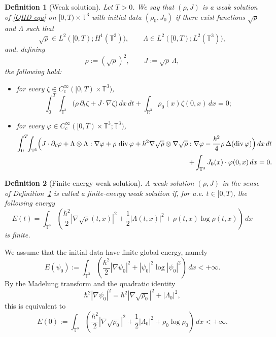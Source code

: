 \documentclass[11pt]{article}
\newtheorem{definition}{Definition}
\begin{document}
\begin{definition}[Weak solution]
\label{def:intro-weak}
Let \(T>0\). We say that \((\rho,J)\) is a weak solution of \eqref{QHD equ} on \([0,T)\times\mathbb{T}^3\) with initial data \((\rho_0,J_0)\) if there exist functions \(\sqrt{\rho}\) and \(\Lambda\) such that
\[
\sqrt{\rho}\in L^2([0,T);H^1(\mathbb{T}^3)),
\qquad
\Lambda\in L^2([0,T);L^2(\mathbb{T}^3)),
\]
and, defining
\[
\rho:=(\sqrt{\rho})^2,
\qquad
J:=\sqrt{\rho}\,\Lambda,
\]
the following hold:
\begin{itemize}
\item for every \(\zeta \in C_c^\infty([0,T)\times\mathbb{T}^3)\),
\[
\int_0^T\!\!\int_{\mathbb{T}^3}
\bigl(\rho\,\partial_t\zeta + J\cdot\nabla\zeta\bigr)\,dx\,dt
+
\int_{\mathbb{R}^3}\rho_0(x)\zeta(0,x)\,dx
=0;
\]
\item for every \(\varphi\in C_c^\infty([0,T)\times\mathbb{T}^3;\mathbb{T}^3)\),
\begin{align*}
\int_0^T\!\!\int_{\mathbb{T}^3}
\Bigl(
J\cdot\partial_t\varphi
+\Lambda\otimes\Lambda:\nabla\varphi
+\rho\,\operatorname{div}\varphi
+\hbar^2\nabla\sqrt{\rho}\otimes\nabla\sqrt{\rho}:\nabla\varphi
-\frac{\hbar^2}{4}\rho\,\Delta(\operatorname{div}\varphi)
\Bigr)\,dx\,dt
\\
+\int_{\mathbb{T}^3}J_0(x)\cdot\varphi(0,x)\,dx
=0.
\end{align*}
\end{itemize}
\end{definition}

\begin{definition}[Finite-energy weak solution]
\label{def:intro-fews}
A weak solution \((\rho,J)\) in the sense of Definition~\ref{def:intro-weak} is called a finite-energy weak solution if, for a.e. \(t\in[0,T)\), 
the following  energy 
\[
E(t)
=
\int_{\mathbb{T}^3}
\left(
\frac{\hbar^2}{2}|\nabla\sqrt{\rho}(t,x)|^2
+
\frac12 |\Lambda(t,x)|^2
+
\rho(t,x)\log \rho(t,x)
\right)\,dx
\]
is finite.
\end{definition}

We assume that the initial data have finite global energy, namely
\[
E(\psi_0)
:=
\int_{\mathbb{T}^3}
\left(
\frac{\hbar^2}{2}|\nabla\psi_0|^2
+
|\psi_0|^2\log |\psi_0|^2
\right)\,dx
<+\infty.
\]
By the Madelung transform and the quadratic identity
\[
\hbar^2|\nabla\psi_0|^2
=
\hbar^2|\nabla\sqrt{\rho_0}|^2
+
|\Lambda_0|^2,
\]
this is equivalent to
\[
E(0)
:=
\int_{\mathbb{T}^3}
\left(
\frac{\hbar^2}{2}|\nabla\sqrt{\rho_0}|^2
+
\frac12 |\Lambda_0|^2
+
\rho_0\log \rho_0
\right)\,dx
<+\infty.
\]
\end{document}
